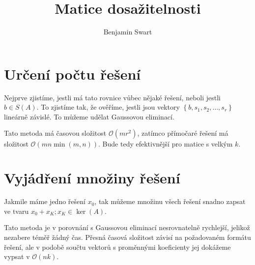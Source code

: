 \documentclass{article}
\title{Matice dosažitelnosti}
\author{Benjamin Swart}
\begin{document}
\section{Určení počtu řešení}

Nejprve zjistíme, jestli má tato rovnice vůbec nějaké řešení, neboli jestli $b \in S\left(A\right)$. To zjistíme tak, že ověříme, jestli jsou vektory $\left\{b, s_1, s_2, \dots,s_r\right\}$ lineárně závislé. To můžeme udělat Gaussovou eliminací.

Tato metoda má časovou složitost $\mathcal{O}\left(m r^2\right)$, zatímco přímočaré řešení má složitost $\mathcal{O}\left(m n \min\left(m, n\right)\right)$. Bude tedy efektivnější pro matice s velkým $k$.

\section{Vyjádření množiny řešení}

Jakmile máme jedno řešení $x_0$, tak můžeme množinu všech řešení snadno zapsat ve tvaru $x_0 + x_K; x_K \in \ker\left(A\right)$.

Tato metoda je v porovnání s Gaussovou eliminací nesrovnatelně rychlejší, jelikož nezabere téměř žádný čas. Přesná časová složitost závisí na požadovaném formátu řešení, ale v podobě součtu vektorů s proměnnými koeficienty jej dokážeme vypsat v $\mathcal{O}\left(nk\right)$.
\end{document}
